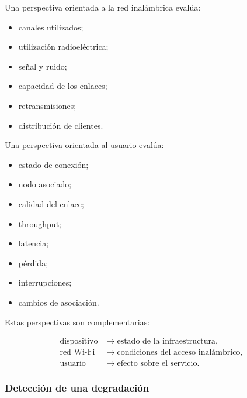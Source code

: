 Una perspectiva orientada a la red inalámbrica evalúa:

\begin{itemize}
    \item canales utilizados;

    \item utilización radioeléctrica;

    \item señal y ruido;

    \item capacidad de los enlaces;

    \item retransmisiones;

    \item distribución de clientes.
\end{itemize}

Una perspectiva orientada al usuario evalúa:

\begin{itemize}
    \item estado de conexión;

    \item nodo asociado;

    \item calidad del enlace;

    \item throughput;

    \item latencia;

    \item pérdida;

    \item interrupciones;

    \item cambios de asociación.
\end{itemize}

Estas perspectivas son complementarias:

\[
\begin{aligned}
    \text{dispositivo}
    &\longrightarrow
    \text{estado de la infraestructura},\\
    \text{red Wi-Fi}
    &\longrightarrow
    \text{condiciones del acceso inalámbrico},\\
    \text{usuario}
    &\longrightarrow
    \text{efecto sobre el servicio}.
\end{aligned}
\]


\subsubsection*{Detección de una degradación}

